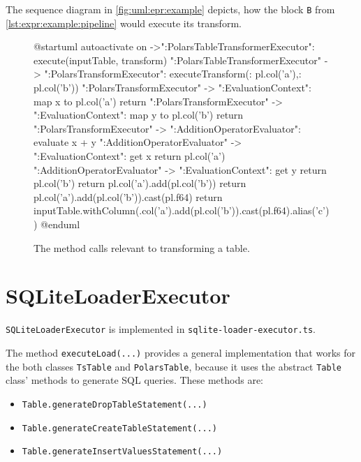 The sequence diagram in \autoref{fig:uml:epr:example} depicts, how the block \Verb|B| from \autoref{lst:expr:example:pipeline} would execute its transform.
\begin{figure}
	\begin{plantuml}
		@startuml
		autoactivate on
		->":PolarsTableTransformerExecutor": execute(inputTable, transform)
		":PolarsTableTransformerExecutor" -> ":PolarsTransformExecutor": executeTransform({\nx: pl.col('a'),\ny: pl.col('b')\n})
		":PolarsTransformExecutor" -> ":EvaluationContext": map x to pl.col('a')
		return
		":PolarsTransformExecutor" -> ":EvaluationContext": map y to pl.col('b')
		return
		":PolarsTransformExecutor" -> ":AdditionOperatorEvaluator": evaluate x + y
		":AdditionOperatorEvaluator" -> ":EvaluationContext": get x
		return pl.col('a')
		":AdditionOperatorEvaluator" -> ":EvaluationContext": get y
		return pl.col('b')
		return pl.col('a')\n.add(pl.col('b'))
		return pl.col('a')\n.add(pl.col('b'))\n.cast(pl.f64)
		return inputTable.withColumn(\npl.col('a')\n.add(pl.col('b'))\n.cast(pl.f64)\n.alias('c')\n)
		@enduml
	\end{plantuml}
	\caption{The method calls relevant to transforming a table.}
	\label{fig:uml:epr:example}
\end{figure}




\section{SQLiteLoaderExecutor}
\label{impl:execs:sqloader}
\Verb|SQLiteLoaderExecutor| is implemented in \Verb|sqlite-loader-executor.ts|.


The method \Verb|executeLoad(...)| provides a general implementation that works for the both classes \Verb|TsTable| and \Verb|PolarsTable|, because it uses the abstract \Verb|Table| class' methods to generate \ac{SQL} queries.
These methods are:
\begin{itemize}
	\item \Verb|Table.generateDropTableStatement(...)|
	\item \Verb|Table.generateCreateTableStatement(...)|
	\item \Verb|Table.generateInsertValuesStatement(...)|
\end{itemize}

